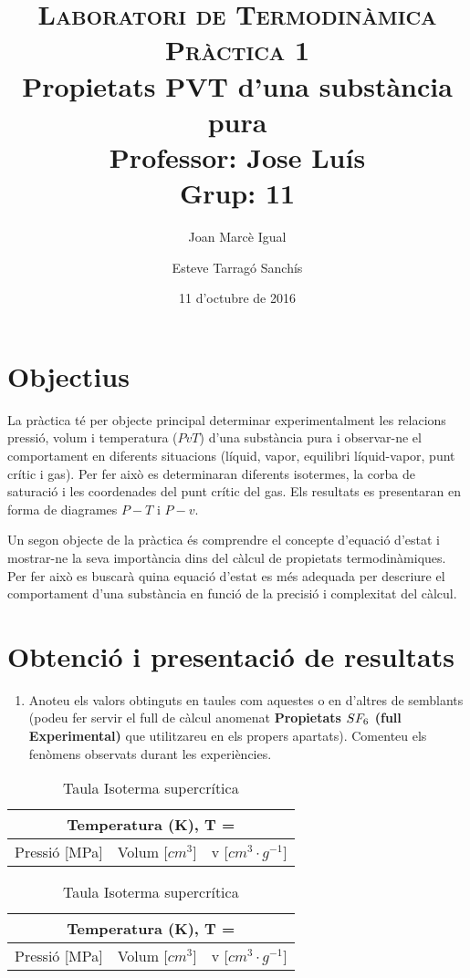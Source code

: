 \documentclass[a4paper]{article}
\title{
	\textsc{Laboratori de Termodinàmica} \\
	\textsc{Pràctica 1} \\
	Propietats PVT d'una substància pura \\
	\large
	Professor: Jose Luís \\ Grup: 11 }
\author{Joan Marcè Igual \and Esteve Tarragó Sanchís}
\date{11 d'octubre de 2016}
\begin{document}
\maketitle

\section*{Objectius}
La pràctica té per objecte principal determinar experimentalment les relacions pressió, volum i temperatura ($PvT$) d'una substància pura i observar-ne el comportament en diferents situacions (líquid, vapor, equilibri líquid-vapor, punt crític i gas). Per fer això es determinaran diferents isotermes, la corba de saturació i les coordenades del punt crític del gas. Els resultats es presentaran en forma de diagrames $P-T$ i $P-v$.

Un segon objecte de la pràctica és comprendre el concepte d’equació d’estat i mostrar-ne la seva importància dins del càlcul de propietats termodinàmiques. Per fer això es buscarà quina equació d’estat es més adequada per descriure el comportament d’una substància en funció de la precisió i complexitat del càlcul.


\section*{Obtenció i presentació de resultats}

\begin{enumerate}
	\item Anoteu els valors obtinguts en taules com aquestes o en d’altres de semblants (podeu fer servir el full de càlcul anomenat \textbf{Propietats $\boldmath SF_6$ (full Experimental)} que utilitzareu en els propers apartats). Comenteu els fenòmens observats durant les experiències.
\end{enumerate}

\begin{table}[H]
	\begin{minipage}{0.49\linewidth}
		\begin{tabular}{rrr}
			\multicolumn{3}{c}{\bf Temperatura (K), T = } \\
			\hline
			Pressió [MPa] & Volum [$cm^3$] & v [$cm^3 · g^{-1}$]
		\end{tabular}
		\caption{Taula Isoterma subcrítica}
	\end{minipage}
	\begin{minipage}{0.49\linewidth}
		\begin{tabular}{rrr}
			\multicolumn{3}{c}{\bf Temperatura (K), T = } \\
			\hline
			Pressió [MPa] & Volum [$cm^3$] & v [$cm^3 · g^{-1}$]
			
		\end{tabular}
		\caption{Taula Isoterma supercrítica}
	\end{minipage}
\end{table}
\end{document}

